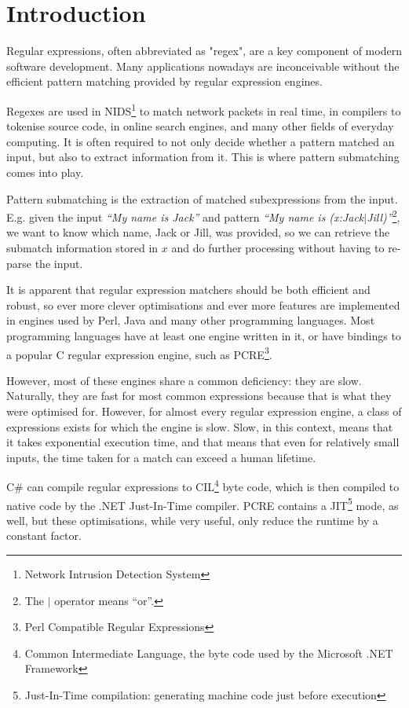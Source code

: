 \chapter{Introduction}

Regular expressions, often abbreviated as "regex", are a key component of modern
software development. Many applications nowadays are inconceivable without the
efficient pattern matching provided by regular expression engines.

Regexes are used in NIDS\footnote{Network Intrusion Detection System} to match
network packets in real time, in compilers to tokenise source code, in online
search engines, and many other fields of everyday computing. It is often
required to not only decide whether a pattern matched an input, but also to
extract information from it. This is where pattern submatching comes into play.

Pattern submatching is the extraction of matched subexpressions from the input.
E.g. given the input \textit{``My name is Jack''} and pattern \textit{``My name
is (x:Jack$|$Jill)''}\footnote{The $|$ operator means ``or''.}, we want to know
which name, Jack or Jill, was provided, so we can retrieve the submatch
information stored in $x$ and do further processing without having to re-parse
the input.

It is apparent that regular expression matchers should be both efficient and
robust, so ever more clever optimisations and ever more features are implemented
in engines used by Perl, Java and many other programming languages. Most
programming languages have at least one engine written in it, or have bindings
to a popular C regular expression engine, such as PCRE\footnote{Perl Compatible
Regular Expressions}.

However, most of these engines share a common deficiency: they are slow.
Naturally, they are fast for most common expressions because that is what they
were optimised for. However, for almost every regular expression engine, a class
of expressions exists for which the engine is slow. Slow, in this context, means
that it takes exponential execution time, and that means that even for
relatively small inputs, the time taken for a match can exceed a human lifetime.

C\# can compile regular expressions to CIL\footnote{Common Intermediate
Language, the byte code used by the Microsoft .NET Framework} byte code, which
is then compiled to native code by the .NET Just-In-Time compiler. PCRE contains
a JIT\footnote{Just-In-Time compilation: generating machine code just before
execution} mode, as well, but these optimisations, while very useful, only
reduce the runtime by a constant factor.

